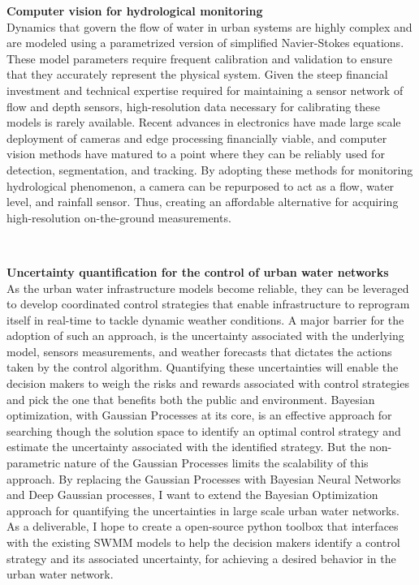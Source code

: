 \noindent \textbf{Computer vision for hydrological monitoring}\\
Dynamics that govern the flow of water in urban systems are highly complex and are modeled using a parametrized version of simplified Navier-Stokes equations.
These model parameters require frequent calibration and validation to ensure that they accurately represent the physical system.
Given the steep financial investment and technical expertise required for maintaining a sensor network of flow and depth sensors, high-resolution data necessary for calibrating these models is rarely available.
Recent advances in electronics have made large scale deployment of cameras and edge processing financially viable, and computer vision methods have matured to a point where they can be reliably used for detection, segmentation, and tracking.
By adopting these methods for monitoring hydrological phenomenon, a camera can be repurposed to act as a flow, water level, and rainfall sensor.
Thus, creating an affordable alternative for acquiring high-resolution on-the-ground measurements.


\

\noindent \textbf{Uncertainty quantification for the control of urban water networks}\\
As the urban water infrastructure models become reliable, they can be leveraged to develop coordinated control strategies that enable infrastructure to reprogram itself in real-time to tackle dynamic weather conditions.
A major barrier for the adoption of such an approach, is the uncertainty associated with the underlying model, sensors measurements, and weather forecasts that dictates the actions taken by the control algorithm.
Quantifying these uncertainties will enable the decision makers to weigh the risks and rewards associated with control strategies and pick the one that benefits both the public and environment.
Bayesian optimization, with Gaussian Processes at its core, is an effective approach for searching though the solution space to identify an optimal control strategy and estimate the uncertainty associated with the identified strategy.
But the non-parametric nature of the Gaussian Processes limits the scalability of this approach.
By replacing the Gaussian Processes with Bayesian Neural Networks and Deep Gaussian processes, I want to extend the Bayesian Optimization approach for quantifying the uncertainties in large scale urban water networks. 
As a deliverable, I hope to create a open-source python toolbox that interfaces with the existing SWMM models to help the decision makers identify a control strategy and its associated uncertainty, for achieving a desired behavior in the urban water network.
